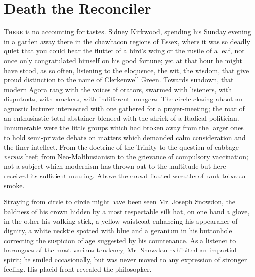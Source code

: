 \chapter{Death the Reconciler}

\textsc{There} is no accounting for tastes. Sidney Kirkwood, spending
his Sunday evening in a garden away there in the chawbacon regions of
Essex, where it was so deadly quiet that you could hear the flutter of a
bird's wdng or the rustle of a leaf, not once only congratulated himself
on his good fortune; yet at that hour he might have stood, as so often,
listening to the eloquence, the wit, the wisdom, that give proud
distinction to the name of Clerkenwell Green. Towards sundown, that
modern Agora rang with the voices of orators, swarmed with listeners,
with disputants, with mockers, with indifferent loungers. The circle
closing about an agnostic lecturer intersected with one gathered for a
prayer-meeting; the roar of an enthusiastic
{\protect\hypertarget{150}{}{}}total-abstainer blended with the shriek
of a Radical politician. Innumerable were the little groups which had
broken away from the larger ones to hold semi-private debate on matters
which demanded calm consideration and the finer intellect. From the
doctrine of the Trinity to the question of cabbage \emph{versus} beef;
from Neo-Malthusianism to the grievance of compulsory vaccination; not a
subject which modernism has thrown out to the multitude but here
received its sufficient mauling. Above the crowd floated wreaths of rank
tobacco smoke.

Straying from circle to circle might have been seen Mr. Joseph Snowdon,
the baldness of his crown hidden by a most respectable silk hat, on one
hand a glove, in the other his walking-stick, a yellow waistcoat
enhancing his appearance of dignity, a white necktie spotted with blue
and a geranium in his buttonhole correcting the suspicion of age
suggested by his countenance. As a listener to harangues of the most
various tendency, Mr. Snowdon exhibited an impartial spirit;
{\protect\hypertarget{151}{}{}}he smiled occasionally, but was never
moved to any expression of stronger feeling. His placid front revealed
the philosopher.

